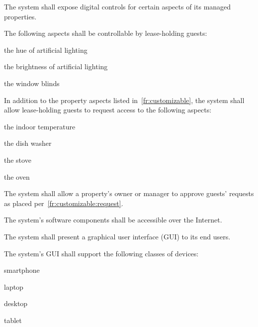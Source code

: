 \documentclass[letter,titlepage,oneside,english]{report}
\begin{document}
\begin{fr}
\begin{fr}
  \end{fr}
\item\label{fr:controls}
  The system shall expose digital controls for certain aspects of its managed properties.
  \begin{fr}
  \item\label{fr:customizable}
    The following aspects shall be controllable by lease-holding guests:
    \begin{fr}
    \item
      the hue of artificial lighting
    \item
      the brightness of artificial lighting
    \item
      the window blinds
    \end{fr}
  \item\label{fr:customizable:request}
    In addition to the property aspects listed in~\ref{fr:customizable}, the system shall allow lease-holding guests to request access to the following aspects:
    \begin{fr}
    \item
      the indoor temperature
    \item
      the dish washer
    \item
      the stove
    \item
      the oven
    \end{fr}
  \item\label{fr:customizable:request_approve}
    The system shall allow a property's owner or manager to approve guests' requests as placed per~\ref{fr:customizable:request}.
  \end{fr}
\item\label{fr:software}
  The system's software components shall be accessible over the Internet.
  \begin{fr}
  \item\label{fr:software:ui}
    The system shall present a graphical user interface (GUI) to its end users.
  \item\label{fr:software:devices}
    The system's GUI shall support the following classes of devices:
    \begin{fr}
    \item
      smartphone
    \item
      laptop
    \item
      desktop
    \item
      tablet
    \end{fr}
  \end{fr}
\item

\end{fr}
\end{document}
